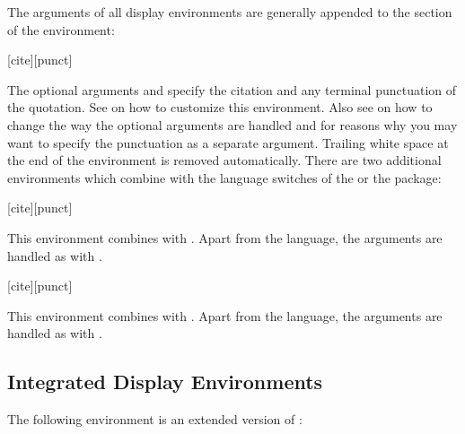 \documentclass{ltxdockit}[2010/09/26]
\begin{document}
The arguments of all display environments are generally appended to the  section of the environment:

\begin{ltxsyntax}

[cite][punct]

The optional arguments  and  specify the citation and any terminal punctuation of the quotation. See  on how to customize this environment. Also see  on how to change the way the optional arguments are handled and  for reasons why you may want to specify the punctuation as a separate argument. Trailing white space at the end of the environment is removed automatically. There are two additional environments which combine  with the language switches of the  or the  package:

[cite][punct]

This environment combines  with . Apart from the language, the arguments are handled as with .

[cite][punct]

This environment combines  with . Apart from the language, the arguments are handled as with .

\end{ltxsyntax}

\subsection{Integrated Display Environments}
\label{env:cit}

The following environment is an extended version of :
\end{document}
